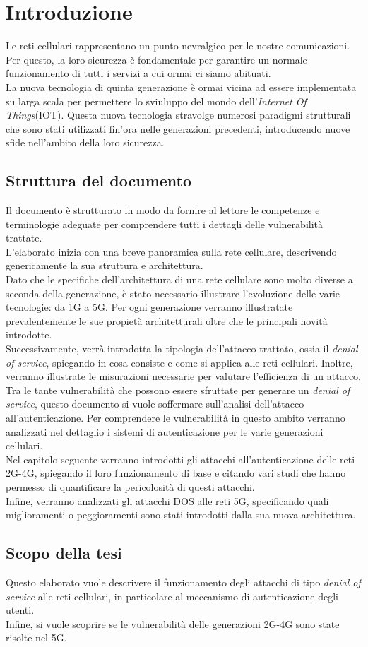 \chapter{Introduzione}
Le reti cellulari rappresentano un punto nevralgico per le nostre comunicazioni.
Per questo, la loro sicurezza è fondamentale per garantire un normale funzionamento
di tutti i servizi a cui ormai ci siamo abituati.\\
La nuova tecnologia di quinta generazione è ormai vicina ad essere implementata su larga scala
per permettere lo sviuluppo del mondo dell'\textit{Internet Of Things}(IOT). Questa nuova tecnologia stravolge numerosi
paradigmi strutturali che sono stati utilizzati fin'ora nelle generazioni precedenti, introducendo nuove sfide nell'ambito
della loro sicurezza.
\section{Struttura del documento}
Il documento è strutturato in modo da fornire al lettore le competenze e terminologie adeguate per comprendere tutti i dettagli delle 
vulnerabilità trattate.\\
L'elaborato inizia con una breve panoramica sulla rete cellulare, descrivendo genericamente la sua struttura e architettura.\\ 
Dato che le specifiche dell'architettura di una rete cellulare sono molto diverse a seconda della generazione, è stato 
necessario illustrare l'evoluzione delle varie tecnologie: da 1G a 5G. 
Per ogni generazione verranno illustratate prevalentemente le sue propietà architetturali oltre che le principali novità introdotte.\\
Successivamente, verrà introdotta la tipologia dell'attacco trattato, ossia il \textit{denial of service}, spiegando in cosa consiste
e come si applica alle reti cellulari. Inoltre, verranno illustrate le misurazioni necessarie per valutare l'efficienza di un attacco.\\
Tra le tante vulnerabilità che possono essere sfruttate per generare un \textit{denial of service}, questo documento si vuole soffermare sull'analisi 
dell'attacco all'autenticazione.
Per comprendere le vulnerabilità in questo ambito verranno analizzati nel dettaglio i sistemi di autenticazione per le varie generazioni cellulari.\\
Nel capitolo seguente verranno introdotti gli attacchi all'autenticazione delle reti 2G-4G, spiegando il loro funzionamento di base e citando vari studi che 
hanno permesso di quantificare la pericolosità di questi attacchi.\\
Infine, verranno analizzati gli attacchi DOS alle reti 5G, specificando quali miglioramenti o peggioramenti sono stati introdotti dalla sua nuova architettura.
\section{Scopo della tesi}
Questo elaborato vuole descrivere il funzionamento degli attacchi di tipo \textit{denial of service} alle reti cellulari, in particolare al meccanismo 
di autenticazione degli utenti.\\
Infine, si vuole scoprire se le vulnerabilità delle generazioni 2G-4G sono state risolte nel 5G.